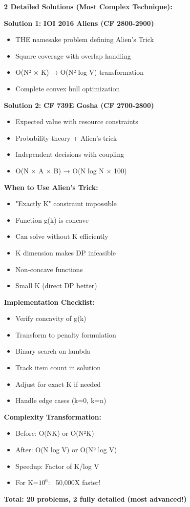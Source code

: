 \documentclass[11pt,a4paper,oneside]{book}
\begin{document}
\begin{tcolorbox}[
    enhanced,breakable,
    colback=primaryblue!10,
    colframe=primaryblue,
    boxrule=2pt,
    arc=4mm,
    title=\textbf{Alien's Trick: Complete Mastery}
]
\textbf{2 Detailed Solutions (Most Complex Technique):}

\textbf{Solution 1: IOI 2016 Aliens (CF 2800-2900)}
\begin{itemize}
\item THE namesake problem defining Alien's Trick
\item Square coverage with overlap handling
\item O(N² × K) → O(N² log V) transformation
\item Complete convex hull optimization
\end{itemize}

\textbf{Solution 2: CF 739E Gosha (CF 2700-2800)}
\begin{itemize}
\item Expected value with resource constraints
\item Probability theory + Alien's trick
\item Independent decisions with coupling
\item O(N × A × B) → O(N log N × 100)
\end{itemize}

\textbf{When to Use Alien's Trick:}
\begin{itemize}
\item [$\checkmark$] "Exactly K" constraint impossible
\item [$\checkmark$] Function g(k) is concave
\item [$\checkmark$] Can solve without K efficiently
\item [$\checkmark$] K dimension makes DP infeasible
\item [$\times$] Non-concave functions
\item [$\times$] Small K (direct DP better)
\end{itemize}

\textbf{Implementation Checklist:}
\begin{itemize}
\item Verify concavity of g(k)
\item Transform to penalty formulation
\item Binary search on lambda
\item Track item count in solution
\item Adjust for exact K if needed
\item Handle edge cases (k=0, k=n)
\end{itemize}

\textbf{Complexity Transformation:}
\begin{itemize}
\item Before: O(NK) or O(N²K)
\item After: O(N log V) or O(N² log V)
\item Speedup: Factor of K/log V
\item For K=$10^6$: ~50,000X faster!
\end{itemize}

\textbf{Total: 20 problems, 2 fully detailed (most advanced!)}
\end{tcolorbox}
\end{document}
